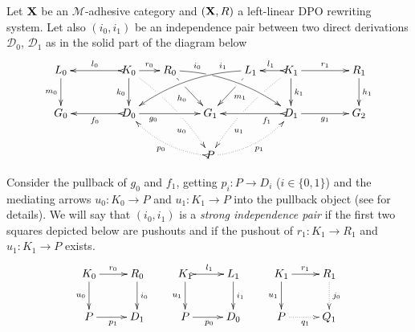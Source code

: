 \documentclass[a4paper,UKenglish,cleveref,pdftex,thm-restate,numberwithinsect,anonymous]{lipics}
\def\R{\mathsf{R}}
\def\X{\textbf {\textup{X}}}
\def\G{\textbf {\textup{G}}}
\newcommand{\dder}[1]{\mathscr{#1}}
\begin{document}
\begin{definition}
  \label{def:filler}
  Let $\X$ be an $\mathcal{M}$-adhesive category 
  and $(\X, \R)$ a left-linear DPO rewriting system. 
  Let also $(i_0, i_1)$ be an independence pair between two direct
  derivations $\dder{D}_0$, $\dder{D}_1$
  as in the solid part of the diagram below
  \[
    \xymatrix@C=18pt{L_0 \ar[d]_{m_0}&& K_0
      \ar[d]_{k_0}\ar@{>->}[ll]_{l_0} \ar[r]^{r_0} \ar@{.>}@/^.20cm/[ddrr]|(.32)\hole|(.57)\hole_(.7){u_0} & R_0
      \ar@/^.35cm/[drrr]|(.3)\hole^(.2){i_0} \ar[dr]|(.3)\hole_{h_0}
      && L_1 \ar@/_.35cm/[dlll]_(.2){i_1} \ar[dl]|(.3)\hole^{m_1}& K_1
      \ar[d]^{k_1}\ar@{>->}[l]_{l_1} \ar[rr]^{r_1} \ar@{.>}@/_.20cm/[ddll]|(.32)\hole|(.57)\hole^(.7){u_1} && R_1 \ar[d]^{h_1} \\
      G_0 &&
      \ar@{>->}[ll]^{f_0} D_0 \ar[rr]_(.3){g_0}&& G_1 &&
      \ar@{>->}[ll]^(.3){f_1} D_1 \ar[rr]_{g_1}&& G_2\\
      & & & & P \ar@/^.3cm/@{>.>}[ull]^{p_0} \ar@/_.3cm/@{.>}[urr]_{p_1}
    }
  \]

  Consider the pullback of $g_0$ and $f_1$, getting $p_i : P \to D_i$
  ($i \in \{0,1\}$) and the mediating arrows $u_0\colon K_0\to P$ and
  $u_1\colon K_1\to P$ into the pullback object (see  for details). 
  We will say that $(i_0, i_1)$ is a \emph{strong independence pair} if
  the first two squares depicted  
  below are pushouts and if the pushout of $r_1 : K_1 \to R_1$ and $u_1 : K_1 \to P$ exists.
  \[
    \xymatrix{
      K_0 \ar[r]^{r_0} \ar[d]_{u_0}& R_0 \ar[d]^{i_0} & K_1
      \ar@{>->}[r]^{l_1} \ar[d]_{u_1}& L_1 \ar[d]^{i_1}
       &K_1 \ar[r]^{r_1} \ar[d]_{u_1}& R_1\ar@{.>}[d]^{j_0}
      \\
      P \ar[r]_{p_1} & D_1 &P \ar[r]_{p_0} & D_0
       & P \ar@{.>}[r]_{q_1} & Q_1
    }
  \]
\end{definition}


\end{document}
